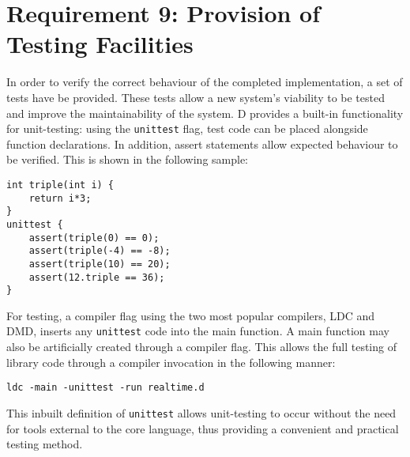 \section{Requirement 9: Provision of Testing Facilities}
In order to verify the correct behaviour of the completed implementation, a set 
of tests have be provided. These tests allow a new system's viability 
to be tested and improve the maintainability of the system. D provides a built-in 
functionality for unit-testing: using the \texttt{unittest} flag, test code can 
be placed alongside function declarations. In addition, assert statements allow 
expected behaviour to be verified. 
This is shown in the following sample:
\begin{lstlisting}[basicstyle=\small]
int triple(int i) {
    return i*3; 
}
unittest {
    assert(triple(0) == 0); 
    assert(triple(-4) == -8); 
    assert(triple(10) == 20); 
    assert(12.triple == 36);
}
\end{lstlisting}
For testing, a compiler flag using the two most popular compilers, LDC and DMD, 
inserts any \texttt{unittest} code into the main function. A main function may 
also be artificially created through a compiler flag. This allows the 
full testing of library code through a compiler invocation in the following manner: 
\begin{lstlisting}[basicstyle=\small]
ldc -main -unittest -run realtime.d
\end{lstlisting}
This inbuilt definition of \texttt{unittest} allows unit-testing to occur 
without the need for tools external to the core language, thus providing a convenient 
and practical testing method. 
